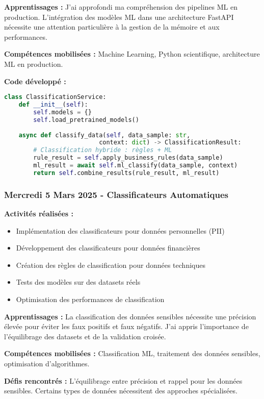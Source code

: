 \textbf{Apprentissages :}
J'ai approfondi ma compréhension des pipelines ML en production. L'intégration des modèles ML dans une architecture FastAPI nécessite une attention particulière à la gestion de la mémoire et aux performances.

\textbf{Compétences mobilisées :}
Machine Learning, Python scientifique, architecture ML en production.

\textbf{Code développé :}
\begin{lstlisting}[language=Python, caption=Service de classification ML]
class ClassificationService:
    def __init__(self):
        self.models = {}
        self.load_pretrained_models()
    
    async def classify_data(self, data_sample: str, 
                          context: dict) -> ClassificationResult:
        # Classification hybride : règles + ML
        rule_result = self.apply_business_rules(data_sample)
        ml_result = await self.ml_classify(data_sample, context)
        return self.combine_results(rule_result, ml_result)
\end{lstlisting}

\subsubsection{Mercredi 5 Mars 2025 - Classificateurs Automatiques}

\textbf{Activités réalisées :}
\begin{itemize}
    \item Implémentation des classificateurs pour données personnelles (PII)
    \item Développement des classificateurs pour données financières
    \item Création des règles de classification pour données techniques
    \item Tests des modèles sur des datasets réels
    \item Optimisation des performances de classification
\end{itemize}

\textbf{Apprentissages :}
La classification des données sensibles nécessite une précision élevée pour éviter les faux positifs et faux négatifs. J'ai appris l'importance de l'équilibrage des datasets et de la validation croisée.

\textbf{Compétences mobilisées :}
Classification ML, traitement des données sensibles, optimisation d'algorithmes.

\textbf{Défis rencontrés :}
L'équilibrage entre précision et rappel pour les données sensibles. Certains types de données nécessitent des approches spécialisées.


